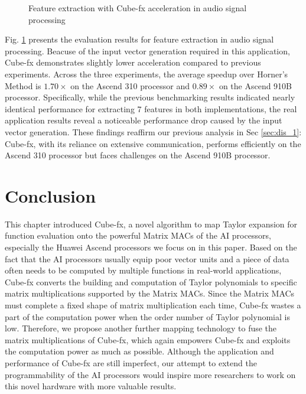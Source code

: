 \begin{figure}[tbp]
  \caption{Feature extraction with Cube-fx acceleration in audio signal processing}
  \label{fig:app_acc_1}
  \end{figure}

Fig. \ref{fig:app_acc_1} presents the evaluation results for feature extraction in audio signal processing. Beacuse of the input vector generation required in this application, Cube-fx demonstrates slightly lower acceleration compared to previous experiments. Across the three experiments, the average speedup over Horner's Method is $1.70\times$ on the Ascend 310 processor and $0.89\times$ on the Ascend 910B processor. Specifically, while the previous benchmarking results indicated nearly identical performance for extracting 7 features in both implementations, the real application results reveal a noticeable performance drop caused by the input vector generation. These findings reaffirm our previous analysis in Sec \ref{sec:dis_1}: Cube-fx, with its reliance on extensive communication, performs efficiently on the Ascend 310 processor but faces challenges on the Ascend 910B processor.

\section{Conclusion \label{sec:8}}

This chapter introduced Cube-fx, a novel algorithm to map Taylor expansion for function evaluation onto the powerful Matrix MACs of the AI processors, especially the Huawei Ascend processors we focus on in this paper. Based on the fact that the AI processors usually equip poor vector units and a piece of data often needs to be computed by multiple functions in real-world applications, Cube-fx converts the building and computation of Taylor polynomials to specific matrix multiplications supported by the Matrix MACs. Since the Matrix MACs must complete a fixed shape of matrix multiplication each time, Cube-fx wastes a part of the computation power when the order number of Taylor polynomial is low. Therefore, we propose another further mapping technology to fuse the matrix multiplications of Cube-fx, which again empowers Cube-fx and exploits the computation power as much as possible. Although the application and performance of Cube-fx are still imperfect, our attempt to extend the programmability of the AI processors would inspire more researchers to work on this novel hardware with more valuable results.